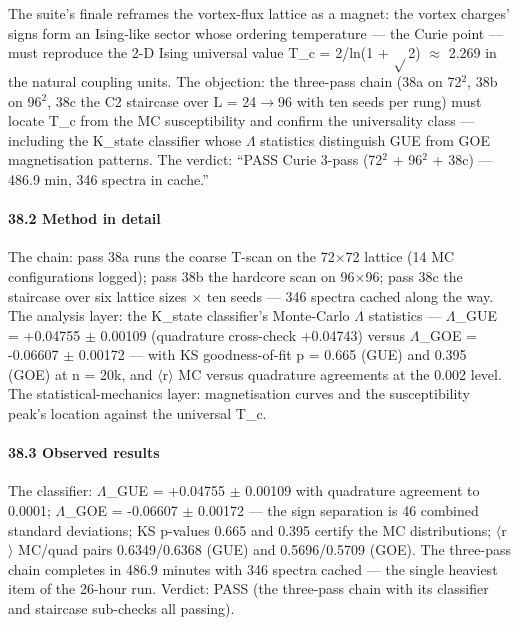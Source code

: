 \documentclass[10pt]{article}
\begin{document}
The suite's finale reframes the vortex-flux lattice as a magnet: the vortex charges' signs form an Ising-like sector whose ordering temperature --- the Curie point --- must reproduce the 2-D Ising universal value T\_c = 2/ln(1 + $\sqrt{}$2) $\approx$ 2.269 in the natural coupling units. The objection: the three-pass chain (38a on 72$^2$, 38b on 96$^2$, 38c the C2 staircase over L = 24$\rightarrow$96 with ten seeds per rung) must locate T\_c from the MC susceptibility and confirm the universality class --- including the K\_state classifier whose $\Lambda$ statistics distinguish GUE from GOE magnetisation patterns. The verdict: ``PASS \textperiodcentered{} Curie 3-pass (72$^2$ + 96$^2$ + 38c) --- 486.9 min, 346 spectra in cache.''

\paragraph{38.2 Method in detail}

The chain: pass 38a runs the coarse T-scan on the 72$\times$72 lattice (14 MC configurations logged); pass 38b the hardcore scan on 96$\times$96; pass 38c the staircase over six lattice sizes $\times$ ten seeds --- 346 spectra cached along the way. The analysis layer: the K\_state classifier's Monte-Carlo $\Lambda$ statistics --- $\Lambda$\_GUE = +0.04755 $\pm$ 0.00109 (quadrature cross-check +0.04743) versus $\Lambda$\_GOE = -0.06607 $\pm$ 0.00172 --- with KS goodness-of-fit p = 0.665 (GUE) and 0.395 (GOE) at n = 20k, and $\langle$r$\rangle$ MC versus quadrature agreements at the 0.002 level. The statistical-mechanics layer: magnetisation curves and the susceptibility peak's location against the universal T\_c.

\paragraph{38.3 Observed results}

The classifier: $\Lambda$\_GUE = +0.04755 $\pm$ 0.00109 with quadrature agreement to 0.0001; $\Lambda$\_GOE = -0.06607 $\pm$ 0.00172 --- the sign separation is 46 combined standard deviations; KS p-values 0.665 and 0.395 certify the MC distributions; $\langle$r$\rangle$ MC/quad pairs 0.6349/0.6368 (GUE) and 0.5696/0.5709 (GOE). The three-pass chain completes in 486.9 minutes with 346 spectra cached --- the single heaviest item of the 26-hour run. Verdict: PASS (the three-pass chain with its classifier and staircase sub-checks all passing).
\end{document}
